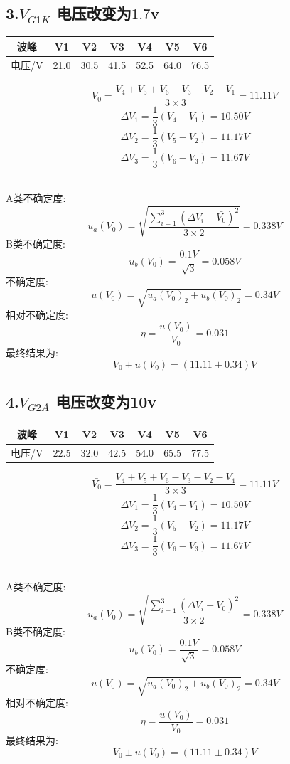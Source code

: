 \documentclass[11pt,a4paper,oneside]{article}
\begin{document}
\subsection*{3.$V_{G1K}$ 电压改变为$1.7$v}
\begin{center}
\begin{tabular}{|c|c|c|c|c|c|c|}
	\hline
	波峰&V1&V2&V3&V4&V5&V6
	\\\hline
	电压/V&21.0&30.5&41.5&52.5&64.0&76.5\\\hline
	\end{tabular}
	\end{center}

$$  \bar{V_0}=\frac{V_4+V_5+V_6-V_3-V_2-V_1}{3\times 3}=11.11V $$
$$	\Delta V_1=\frac{1}{3}(V_4-V_1)=10.50V $$
$$	\Delta V_2=\frac{1}{3}(V_5-V_2)=11.17V $$
$$	\Delta V_3=\frac{1}{3}(V_6-V_3)=11.67V $$ 

\ \\
A类不确定度:
$$	u_a(V_0)=\sqrt{\frac{\sum\limits_{i=1}^{3} (\Delta V_i-\bar{V_0})^2}{3\times 2}}=0.338V $$
B类不确定度:
$$	u_b(V_0)=\frac{0.1V}{\sqrt{3}}=0.058V $$
不确定度:
$$	u(V_0)=\sqrt{u_a(V_0)_2+u_b(V_0)_2}=0.34V $$
相对不确定度:
$$	\eta=\frac{u(V_0)}{V_0}=0.031 $$
最终结果为:
$$	V_0 \pm u(V_0) = (11.11 \pm 0.34)V $$


\subsection*{4.$V_{G2A}$ 电压改变为10v}
\begin{center}
\begin{tabular}{|c|c|c|c|c|c|c|}
	\hline
	波峰&V1&V2&V3&V4&V5&V6
	\\\hline
	电压/V&22.5&32.0&42.5&54.0&65.5&77.5\\\hline
	\end{tabular}
	\end{center}

$$  \bar{V_0}=\frac{V_4+V_5+V_6-V_3-V_2-V_4}{3\times 3}=11.11V $$
$$	\Delta V_1=\frac{1}{3}(V_4-V_1)=10.50V $$
$$	\Delta V_2=\frac{1}{3}(V_5-V_2)=11.17V $$
$$	\Delta V_3=\frac{1}{3}(V_6-V_3)=11.67V $$ 

\ \\
A类不确定度:
$$	u_a(V_0)=\sqrt{\frac{\sum\limits_{i=1}^{3} (\Delta V_i-\bar{V_0})^2}{3\times 2}}=0.338V $$
B类不确定度:
$$	u_b(V_0)=\frac{0.1V}{\sqrt{3}}=0.058V $$
不确定度:
$$	u(V_0)=\sqrt{u_a(V_0)_2+u_b(V_0)_2}=0.34V $$
相对不确定度:
$$	\eta=\frac{u(V_0)}{V_0}=0.031 $$
最终结果为:
$$	V_0 \pm u(V_0) = (11.11 \pm 0.34)V $$
\end{document}
